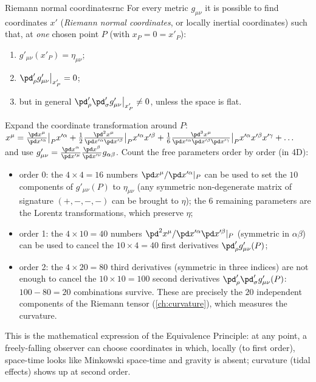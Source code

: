 \begin{theorem}{Riemann normal coordinates}{rnc}
For every metric $g_{\mu\nu}$ it is possible to find coordinates $x'$ (\emph{Riemann normal coordinates}, or locally inertial coordinates) such that, at \emph{one} chosen point $P$ (with $x_P=0=x'_P$):
\begin{enumerate}[nosep]
  \item $g'_{\mu\nu}(x'_P)=\eta_{\mu\nu}$;
  \item $\pd'_\rho g'_{\mu\nu}\big|_{x'_P}=0$;
  \item but in general $\pd'_\rho\pd'_\sigma g'_{\mu\nu}\big|_{x'_P}\neq0$, unless the space is flat.
\end{enumerate}
\end{theorem}
\begin{proofsketch}
Expand the coordinate transformation around $P$: $x^\mu=\frac{\pd x^\mu}{\pd x'^\alpha}\big|_P x'^\alpha+\frac12\frac{\pd^2x^\mu}{\pd x'^\alpha\pd x'^\beta}\big|_P x'^\alpha x'^\beta+\frac16\frac{\pd^3 x^\mu}{\pd x'^\alpha\pd x'^\beta\pd x'^\gamma}\big|_P x'^\alpha x'^\beta x'^\gamma+\dots$ and use $g'_{\mu\nu}=\frac{\pd x^\alpha}{\pd x'^\mu}\frac{\pd x^\beta}{\pd x'^\nu}g_{\alpha\beta}$. Count the free parameters order by order (in 4D):
\begin{itemize}[nosep]
\item order 0: the $4\times4=16$ numbers $\pd x^\mu/\pd x'^\alpha|_P$ can be used to set the $10$ components of $g'_{\mu\nu}(P)$ to $\eta_{\mu\nu}$ (any symmetric non-degenerate matrix of signature $(+,-,-,-)$ can be brought to $\eta$); the $6$ remaining parameters are the Lorentz transformations, which preserve $\eta$;
\item order 1: the $4\times10=40$ numbers $\pd^2x^\mu/\pd x'^\alpha\pd x'^\beta|_P$ (symmetric in $\alpha\beta$) can be used to cancel the $10\times4=40$ first derivatives $\pd'_\rho g'_{\mu\nu}(P)$;
\item order 2: the $4\times20=80$ third derivatives (symmetric in three indices) are not enough to cancel the $10\times10=100$ second derivatives $\pd'_\rho\pd'_\sigma g'_{\mu\nu}(P)$: $100-80=20$ combinations survive. These are precisely the $20$ independent components of the Riemann tensor (\cref{ch:curvature}), which measures the curvature.
\end{itemize}
\end{proofsketch}
This is the mathematical expression of the Equivalence Principle: at any point, a freely-falling observer can choose coordinates in which, locally (to first order), space-time looks like Minkowski space-time and gravity is absent; curvature (tidal effects) shows up at second order.

